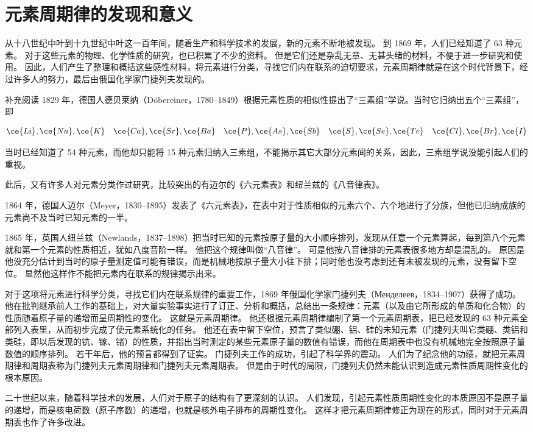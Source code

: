 \section{元素周期律的发现和意义}
从十八世纪中叶到十九世纪中叶这一百年间，随着生产和科学技术的发展，新的元素不断地被发现。
到 1869 年，人们已经知道了 63 种元素。
对于这些元素的物理、化学性质的研究，也已积累了不少的资料。
但是它们还是杂乱无章、无甚头绪的材料，不便于进一步研究和使用。
因此，人们产生了整理和概括这些感性材料，将元素进行分类，寻找它们内在联系的迫切要求，元素周期律就是在这个时代背景下，经过许多人的努力，最后由俄国化学家门捷列夫发现的。
\begin{Reading}[]{补充阅读}
1829 年，德国人德贝莱纳（D\"obereiner，1780--1849）根据元素性质的相似性提出了“三素组”学说。当时它归纳出五个“三素组”，即

\[ \ce{Li},\ce{Na},\ce{K}\quad\ce{Ca},\ce{Sr},\ce{Ba}\quad\ce{P},\ce{As}, \ce{Sb}\quad\ce{S},\ce{Se},\ce{Te}\quad \ce{Cl},\ce{Br},\ce{I}\]

当时已经知道了 54 种元素，而他却只能将 15 种元素归纳入三素组，不能揭示其它大部分元素间的关系，因此，三素组学说没能引起人们的重视。

此后，又有许多人对元素分类作过研究，比较突出的有迈尔的《六元素表》和纽兰兹的《八音律表》。

1864 年，德国人迈尔（Meyer，1830--1895）发表了《六元素表》，在表中对于性质相似的元素六个、六个地进行了分族，但他已归纳成族的元素尚不及当时已知元素的一半。

1865 年，英国人纽兰兹（Newlands，1837--1898）把当时已知的元素按原子量的大小顺序排列，发现从任意一个元素算起，每到第八个元素就和第一个元素的性质相近，犹如八度音阶一样。
他把这个规律叫做“八音律”。
可是他按八音律排的元素表很多地方却是混乱的。
原因是他没充分估计到当时的原子量测定值可能有错误，而是机械地按原子量大小往下排；同时他也没考虑到还有未被发现的元素，没有留下空位。
显然他这样作不能把元素内在联系的规律揭示出来。

对于这项将元素进行科学分类，寻找它们内在联系规律的重要工作，1869 年俄国化学家门捷列夫（{\rcmu Менделеев}，1834--1907）获得了成功。
他在批判继承前人工作的基础上，对大量实验事实进行了订正、分析和概括，总结出一条规律：元素（以及由它所形成的单质和化合物）的性质随着原子量的递增而呈周期性的变化。
这就是元素周期律。
他还根据元素周期律编制了第一个元素周期表，把已经发现的 63 种元素全部列入表里，从而初步完成了使元素系统化的任务。
他还在表中留下空位，预言了类似硼、铝、硅的未知元素（门捷列夫叫它类硼、类铝和类硅，即以后发现的钪、镓、锗）的性质，并指出当时测定的某些元素原子量的数值有错误，而他在周期表中也没有机械地完全按照原子量数值的顺序排列。
若干年后，他的预言都得到了证实。
门捷列夫工作的成功，引起了科学界的震动。
人们为了纪念他的功绩，就把元素周期律和周期表称为门捷列夫元素周期律和门捷列夫元素周期表。
但是由于时代的局限，门捷列夫仍然未能认识到造成元素性质周期性变化的根本原因。

二十世纪以来，随着科学技术的发展，人们对于原子的结构有了更深刻的认识。
人们发现，引起元素性质周期性变化的本质原因不是原子量的递增，而是核电荷数（原子序数）的递增，也就是核外电子排布的周期性变化。
这样才把元素周期律修正为现在的形式，同时对于元素周期表也作了许多改进。
\end{Reading}

